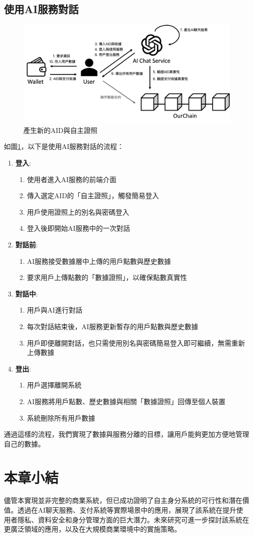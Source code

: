 \subsection{使用AI服務對話}
\begin{figure}
  \centering
  \includegraphics[width=\linewidth, keepaspectratio]{figures/implement-3.png}
  \caption{產生新的AID與自主證照}
  \label{fig:implement-3}
\end{figure}
如圖\ref{fig:implement-3}，以下是使用AI服務對話的流程：
\begin{enumerate}
  \item \textbf{登入}:
        \begin{enumerate}
          \item 使用者進入AI服務的前端介面
          \item 傳入選定AID的「自主證照」，觸發簡易登入
          \item 用戶使用證照上的別名與密碼登入
          \item 登入後即開始AI服務中的一次對話
        \end{enumerate}
  \item \textbf{對話前}:
        \begin{enumerate}
          \item AI服務接受數據層中上傳的用戶點數與歷史數據
          \item 要求用戶上傳點數的「數據證照」，以確保點數真實性
        \end{enumerate}
  \item \textbf{對話中}:
        \begin{enumerate}
          \item 用戶與AI進行對話
          \item 每次對話結束後，AI服務更新暫存的用戶點數與歷史數據
          \item 用戶即便離開對話，也只需使用別名與密碼簡易登入即可繼續，無需重新上傳數據
        \end{enumerate}
  \item \textbf{登出}:
        \begin{enumerate}
          \item 用戶選擇離開系統
          \item AI服務將用戶點數、歷史數據與相關「數據證照」回傳至個人裝置
          \item 系統刪除所有用戶數據
        \end{enumerate}
\end{enumerate}
通過這樣的流程，我們實現了數據與服務分離的目標，讓用戶能夠更加方便地管理自己的數據。
\section{本章小結}
儘管本實現並非完整的商業系統，但已成功證明了自主身分系統的可行性和潛在價值。透過在AI聊天服務、支付系統等實際場景中的應用，展現了該系統在提升使用者隱私、資料安全和身分管理方面的巨大潛力。未來研究可進一步探討該系統在更廣泛領域的應用，以及在大規模商業環境中的實施策略。